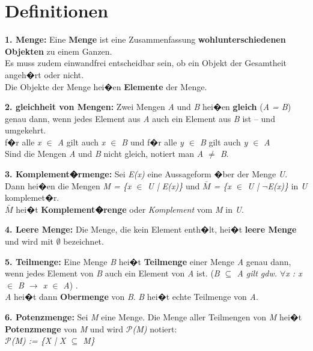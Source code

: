 \section*{Definitionen}
\vspace{-0.3cm}

\textbf{1. Menge:} Eine \textbf{Menge} ist eine Zusammenfassung \textbf{wohlunterschiedenen Objekten} zu einem Ganzen.\\
Es muss zudem einwandfrei entscheidbar sein, ob ein Objekt der Gesamtheit angeh�rt oder nicht.\\
Die Objekte der Menge hei�en \textbf{Elemente} der Menge.

\textbf{2. gleichheit von Mengen:} Zwei Mengen \textit{A} und \textit{B} hei�en \textbf{gleich} (\textit{A = B}) genau dann, wenn jedes Element aus \textit{A} auch ein Element aus \textit{B} ist -- und umgekehrt.\\
f�r alle \textit{x $\in$ A} gilt auch \textit{x $\in$ B} und f�r alle \textit{y $\in$ B} gilt auch \textit{y $\in$ A}\\
Sind die Mengen \textit{A} und \textit{B} nicht gleich, notiert man \textit{A $\neq$ B}.

\textbf{3. Komplement�rmenge:} Sei \textit{E(x)} eine Aussageform �ber der Menge \textit{U}.\\
Dann hei�en die Mengen \textit{M = \{x $\in$ U | E(x)\}} und \textit{\begin{math}\bar{M}\end{math} = \{x $\in$ U | $\neg$E(x)\}} in \textit{U} komplemet�r.\\
\textit{\begin{math}\bar{M}\end{math}} hei�t \textbf{Komplement�renge} oder \textit{Komplement} vom \textit{M} in \textit{U}.

\textbf{4. Leere Menge:} Die Menge, die kein Element enth�lt, hei�t \textbf{leere Menge} und wird mit \textit{$\emptyset$} bezeichnet.

\textbf{5. Teilmenge:} Eine Menge \textit{B} hei�t \textbf{Teilmenge} einer Menge \textit{A} genau dann, wenn jedes Element von \textit{B} auch ein Element von \textit{A} ist. (\textit{B $\subseteq$ A gilt gdw. $\forall$x : x $\in$ B $\rightarrow$ x $\in$ A}) .\\
\textit{A} hei�t dann \textbf{Obermenge} von \textit{B}. \textit{B} hei�t echte Teilmenge von \textit{A}.

\textbf{6. Potenzmenge:} Sei \textit{M} eine Menge. Die Menge aller Teilmengen von \textit{M} hei�t \textbf{Potenzmenge} von \textit{M} und wird \textit{$\mathcal{P}$(M)} notiert: \\\textit{$\mathcal{P}$(M) := \{X | X $\subseteq$ M\}}

